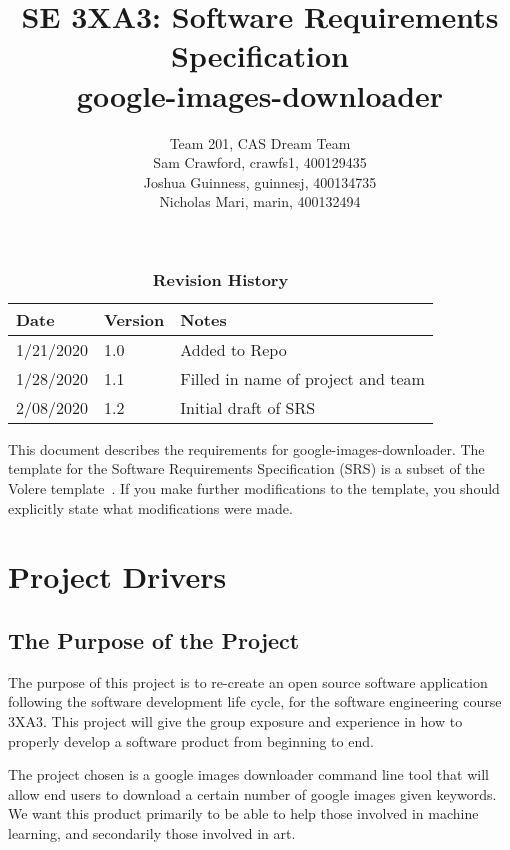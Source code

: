 \documentclass[12pt, titlepage]{article}
\title{SE 3XA3: Software Requirements Specification\\google-images-downloader}
\author{Team 201, CAS Dream Team
		\\ Sam Crawford, crawfs1, 400129435
		\\ Joshua Guinness, guinnesj, 400134735
		\\ Nicholas Mari, marin, 400132494
}
\begin{document}
\maketitle

\tableofcontents
\listoftables
\listoffigures

\begin{table}[bp]
\caption{\bf Revision History}
\begin{tabularx}{\textwidth}{p{3cm}p{2cm}X}
\toprule {\bf Date} & {\bf Version} & {\bf Notes}\\
\midrule
1/21/2020 & 1.0 & Added to Repo\\
1/28/2020 & 1.1 & Filled in name of project and team\\
2/08/2020 & 1.2 & Initial draft of SRS \\
\bottomrule
\end{tabularx}
\end{table}

\newpage


This document describes the requirements for google-images-downloader.  The 
template for the Software Requirements Specification (SRS) is a subset of the Volere
template~\citep{RobertsonAndRobertson2012}.  If you make further modifications
to the template, you should explicitly state what modifications were made.

\section{Project Drivers}

\subsection{The Purpose of the Project}

The purpose of this project is to re-create an open source software application following the software development life cycle, for the software engineering course 3XA3. This project will give the group exposure and experience in how to properly develop a software product from beginning to end.

The project chosen is a google images downloader command line tool that will allow end users to download a certain number of google images given keywords. We want this product primarily to be able to help those involved in machine learning, and secondarily those involved in art.
\end{document}
